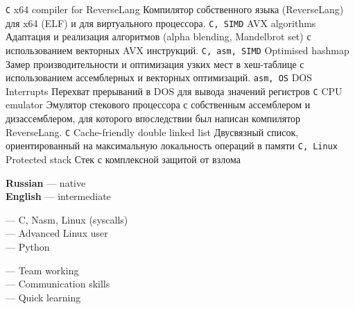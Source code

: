 \documentclass[9pt]{developercv} %
\begin{document}

\begin{entrylist}
	\entry
        {\texttt{C}}
		{x64 compiler for ReverseLang}
		{}
		{Компилятор собственного языка (ReverseLang) для x64 (ELF) и для виртуального процессора.}
	\entry
		{\texttt{C, SIMD}}
		{AVX algorithms}
		{}
		{Адаптация и реализация алгоритмов (alpha blending, Mandelbrot set) с использованием векторных AVX инструкций.}
    \entry
		{\texttt{C, asm, SIMD}}
		{Optimised hashmap}
		{}
		{Замер производительности и оптимизация узких мест в хеш-таблице с использованием ассемблерных и векторных оптимизаций.}
    \entry
		{\texttt{asm, OS}}
		{DOS Interrupts}
		{}
		{Перехват прерываний в DOS для вывода значений регистров}
  	\entry
		{\texttt{C}}
		{CPU emulator}
		{}
		{Эмулятор стекового процессора с собственным ассемблером и дизассемблером, для которого впоследствии был написан компилятор ReverseLang.}
    \entry
        {\texttt{C}}
		{Cache-friendly double linked list}
		{}
		{Двусвязный список, ориентированный на максимальную локальность операций в памяти}
    \entry
		{\texttt{C, Linux}}
		{Protected stack}
		{}
		{Стек с комплексной защитой от взлома}
\end{entrylist}


\begin{minipage}[t]{0.3\textwidth}
	\vspace{-\baselineskip} %


	\textbf{Russian} — native\\
	\textbf{English} — intermediate\\
\end{minipage}
\hfill
\begin{minipage}[t]{0.3\textwidth}
	\vspace{-\baselineskip} %

    — C, Nasm, Linux (syscalls)\\
	— Advanced Linux user\\
    — Python
\end{minipage}
\hfill
\begin{minipage}[t]{0.3\textwidth}
	\vspace{-\baselineskip} %

	— Team working\\
    — Communication skills\\
    — Quick learning
\end{minipage}
\end{document}
